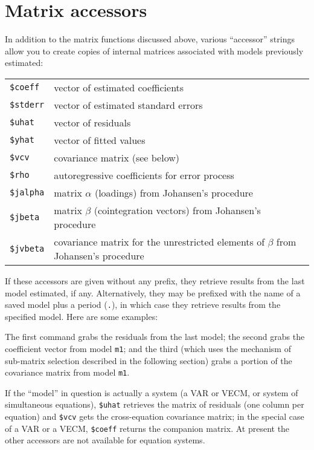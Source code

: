 \section{Matrix accessors}
\label{matrix-accessors}

In addition to the matrix functions discussed above,
various ``accessor'' strings allow you to create copies of internal
matrices associated with models previously estimated:

\begin{center}
\begin{tabular}{ll}
\texttt{\$coeff}  & vector of estimated coefficients \\
\texttt{\$stderr} & vector of estimated standard errors \\
\texttt{\$uhat}   & vector of residuals \\
\texttt{\$yhat}   & vector of fitted values \\
\texttt{\$vcv}    & covariance matrix (see below) \\
\texttt{\$rho}    & autoregressive coefficients for error process \\
\texttt{\$jalpha} & matrix $\alpha$ (loadings) from Johansen's procedure \\
\texttt{\$jbeta}  & matrix $\beta$ (cointegration vectors) from
Johansen's procedure \\
\texttt{\$jvbeta} & covariance matrix for the unrestricted elements of
$\beta$ from Johansen's procedure
\end{tabular}
\end{center}

If these accessors are given without any prefix, they retrieve results
from the last model estimated, if any.  Alternatively, they may be
prefixed with the name of a saved model plus a period (\texttt{.}), in
which case they retrieve results from the specified model.  Here are
some examples:
%
%
The first command grabs the residuals from the last model; the second
grabs the coefficient vector from model \texttt{m1}; and the third
(which uses the mechanism of sub-matrix selection described in the
following section) grabs a portion of the covariance matrix from model
\texttt{m1}.

If the ``model'' in question is actually a system (a VAR or VECM, or
system of simultaneous equations), \verb|$uhat| retrieves the
matrix of residuals (one column per equation) and \verb|$vcv| gets
the cross-equation covariance matrix; in the special case of a VAR or
a VECM, \verb|$coeff| returns the companion matrix. At present the
other accessors are not available for equation systems.

